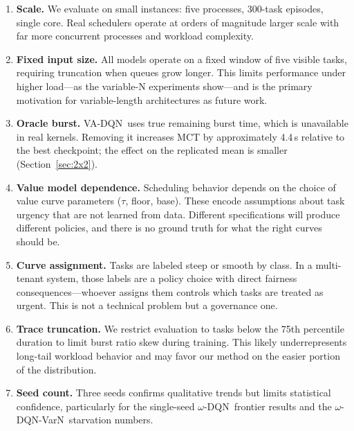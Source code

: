 \documentclass[10pt,twocolumn]{article}
\theoremstyle{remark}
\newcommand{\vadqn}{VA-DQN}
\newcommand{\omegadqn}{$\omega$-DQN}
\newcommand{\omegavarn}{$\omega$-DQN-VarN}
\begin{document}
\begin{enumerate}[itemsep=2pt]

\item \textbf{Scale.} We evaluate on small instances: five processes,
  300-task episodes, single core. Real schedulers operate at orders
  of magnitude larger scale with far more concurrent processes and
  workload complexity.

\item \textbf{Fixed input size.} All models operate on a fixed window
  of five visible tasks, requiring truncation when queues grow
  longer. This limits performance under higher load---as the
  variable-N experiments show---and is the primary motivation for
  variable-length architectures as future work.

\item \textbf{Oracle burst.} \vadqn\ uses true remaining burst time,
  which is unavailable in real kernels. Removing it increases MCT by
  approximately 4.4\,s relative to the best checkpoint; the effect
  on the replicated mean is smaller (Section~\ref{sec:2x2}).

\item \textbf{Value model dependence.} Scheduling behavior depends on
  the choice of value curve parameters ($\tau$, floor, base). These
  encode assumptions about task urgency that are not learned from
  data. Different specifications will produce different policies, and
  there is no ground truth for what the right curves should be.

\item \textbf{Curve assignment.} Tasks are labeled steep or smooth by
  class. In a multi-tenant system, those labels are a policy choice
  with direct fairness consequences---whoever assigns them controls
  which tasks are treated as urgent. This is not a technical problem
  but a governance one.

\item \textbf{Trace truncation.} We restrict evaluation to tasks
  below the 75th percentile duration to limit burst ratio skew
  during training. This likely underrepresents long-tail workload
  behavior and may favor our method on the easier portion of the
  distribution.

\item \textbf{Seed count.} Three seeds confirms qualitative trends
  but limits statistical confidence, particularly for the single-seed
  \omegadqn\ frontier results and the \omegavarn\ starvation numbers.

\end{enumerate}
\end{document}

